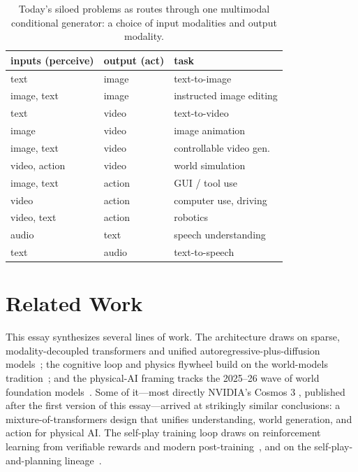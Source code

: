 \documentclass[10pt,conference]{IEEEtran}
\begin{document}
\begin{table}[t]
\centering
\caption{Today's siloed problems as routes through one multimodal conditional
generator: a choice of input modalities and output modality.}
\label{tab:routes}
\small
\begin{tabular}{@{}lll@{}}
\toprule
inputs (perceive) & output (act) & task \\
\midrule
text & image & text-to-image \\
image, text & image & instructed image editing \\
text & video & text-to-video \\
image & video & image animation \\
image, text & video & controllable video gen. \\
video, action & video & world simulation \\
image, text & action & GUI / tool use \\
video & action & computer use, driving \\
video, text & action & robotics \\
audio & text & speech understanding \\
text & audio & text-to-speech \\
\bottomrule
\end{tabular}
\end{table}

\section{Related Work}
This essay synthesizes several lines of work. The architecture draws on sparse,
modality-decoupled transformers and unified autoregressive-plus-diffusion models~\cite{ref1,ref2,ref3,ref4,ref5,ref6,ref7,ref8,ref9,ref10};
the cognitive loop and physics flywheel build on the world-models tradition~\cite{ref11,ref12,ref13,ref14,ref15,ref16,ref17,ref18}; and
the physical-AI framing tracks the 2025--26 wave of world foundation models~\cite{ref19,ref20,ref21,ref22,ref23,ref24,ref25,ref26,ref27,ref28}. Some of
it---most directly NVIDIA's Cosmos 3 \cite{ref19}, published after the first
version of this essay---arrived at strikingly similar conclusions: a
mixture-of-transformers design that unifies understanding, world
generation, and action for physical AI. The self-play training loop draws on reinforcement learning from verifiable rewards and modern post-training~\cite{ref29,ref30,ref31,ref32,ref33,ref34}, and on the self-play-and-planning lineage~\cite{ref35,ref36}.
\end{document}
